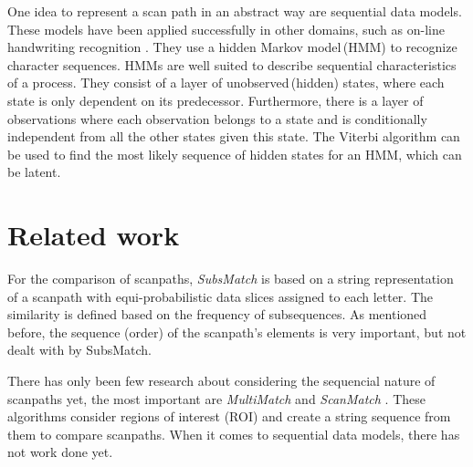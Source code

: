 \documentclass[
        a4paper,     %
        parskip      %
        ]{scrartcl} %
\begin{document}
  
One idea to represent a scan path in an abstract way are sequential data models.   
These models have been applied successfully in other domains, such as on-line handwriting recognition \cite{nag1986script}. They use a hidden Markov model\,(HMM) to recognize character sequences. 
HMMs are well suited to describe sequential characteristics of a process. They consist of a layer of unobserved\,(hidden) states, where each state is only dependent on its predecessor. 
Furthermore, there is a layer of observations where each observation belongs to a state and is conditionally independent from all the other states given this state.
The Viterbi algorithm can be used to find the most likely sequence of hidden states for an HMM, which can be latent. %





  
  \section{Related work}

For the comparison of scanpaths, \emph{SubsMatch} \cite{SubsMatch} is based on a string representation of a scanpath with equi-probabilistic data slices assigned to each letter. The similarity is defined based on the frequency of subsequences.  
As mentioned before, the sequence (order) of the scanpath's elements is very important, but not dealt with by SubsMatch. 

There has only been few research about considering the sequencial nature of scanpaths yet, the most important are \emph{MultiMatch} \cite{dewhurst2012depends} and \emph{ScanMatch} \cite{CristinoEtAl2010}.
These algorithms consider regions of interest (ROI) and create a string sequence from them to compare scanpaths. 
When it comes to sequential data models, there has not work done yet. 
\end{document}
